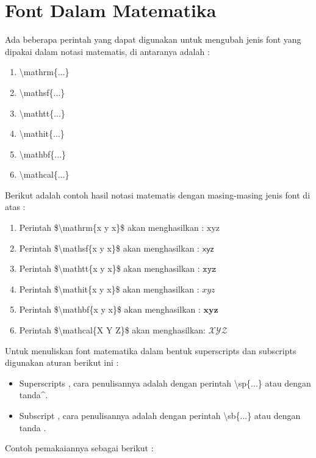 \section{Font Dalam Matematika}
Ada beberapa perintah yang dapat digunakan untuk mengubah jenis font yang dipakai dalam notasi matematis, di antaranya adalah :\\
\begin{enumerate}
\item 	\textbackslash mathrm\{...\}
\item	\textbackslash mathsf\{...\}
\item	\textbackslash mathtt\{...\}
\item	\textbackslash mathit\{...\}
\item	\textbackslash mathbf\{...\}
\item	\textbackslash mathcal\{...\}
\end{enumerate}
\vspace{0.5 cm}
 Berikut adalah contoh hasil notasi matematis dengan masing-masing jenis font di atas :\\
\begin{enumerate}
\item Perintah \$\textbackslash mathrm\{x y x\}\$ akan menghasilkan : $\mathrm{xyz}$
\item  Perintah \$\textbackslash mathsf\{x y x\}\$ akan menghasilkan :   $\mathsf{xyz}$
\item  Perintah \$\textbackslash mathtt\{x y x\}\$ akan menghasilkan :    $\mathtt{xyz}$
\item  Perintah \$\textbackslash mathit\{x y x\}\$ akan menghasilkan :    $\mathit{xyz}$
\item  Perintah \$\textbackslash mathbf\{x y x\}\$ akan menghasilkan :   $\mathbf{xyz}$
\item  Perintah \$\textbackslash mathcal\{X Y Z\}\$ akan menghasilkan:  $\mathcal{XYZ}$
\end{enumerate}
 Untuk menuliskan font matematika dalam bentuk superscripts dan subscripts digunakan aturan berikut ini :
\begin{itemize}
\item Superscripts , cara penulisannya adalah dengan perintah \textbackslash sp\{...\} atau dengan tanda\^{}.
\item  Subscript , cara penulisannya adalah dengan perintah \textbackslash sb\{...\} atau dengan tanda .

\end{itemize}
Contoh pemakaiannya sebagai berikut :\\[0.5 cm]
